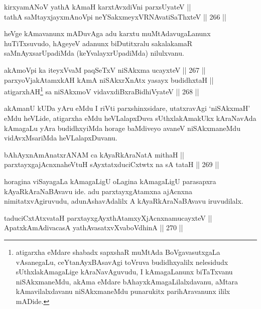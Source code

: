 \begin{shl}
kirxyamANoV yathA kAmaH karxtAvxdiVni parxsUyateV || \\
tathA saMtayxjayxmAnoV\s pi neYSakxmeyxVRNAvatiSaThxteV \hfill || 266 ||  
\end{shl}

\begin{artha}
heVge kAmavanunx mADuvAga adu karxtu muMtAdavugaLanunx huTiTxsuvudo,
hAgeyeV adanunx biDutitxralu sakalakamaR saMnAyxsarUpadiMda
(keYvalayxrUpadiMda) nilulxvanu.
\end{artha}


\begin{shl}
akAmoV\s pi ka iteyxVvaM paqSeTxV niSAkxma ucayxteV \hfill || 267 ||  \\
parxyoVjakAtamxkAH kAmA niSAkxrXnAtx yasayx budidhxtaH || \\
atigarxhAH\footnote{atigarxha eMdare shabadx sapxshaR muMtAda BoVgavasutxgaLa vAsanegaLu, ceYtanAyxBAsavAgi toVruva budidhxyalilx nelesidudx sUthxlakAmagaLige kAraNavAguvudu, I kAmagaLanunx biTaTxvanu niSAkxmaneMdu, akAma eMdare bAhayxkAmagaLilalxdavanu, aMtara kAmavilalxdavanu niSAkxmaneMdu punarukitx parihAravanunx ililx mADide.} sa niSAkxmoV vidavxdiBxraBidhiVyateV \hfill || 268 ||  
\end{shl}


\begin{artha}
akAmanU kUDa yAru eMdu I riVti parxshinxsidare, utatxravAgi
`niSAkxmaH' eMdu heVLide, atigarxha eMdu heVLalapxDuva sUthxlakAmakUkx
kAraNavAda kAmagaLu yAra budidhxyiMda horage baMdiveyo avaneV
niSAkxmaneMdu vidAvxMsariMda heVLalapxDuvanu.
\end{artha}

\begin{shl}
bAhAyxnAmAnatxrANAM ca kAyaRkAraNatA mithaH || \\
parxtayxgajAcnxnaheVtuH sAyxtatxduciCxtwtx na sA tataH \hfill || 269 ||  
\end{shl}

\begin{artha}
horagina viSayagaLa kAmagaLigU oLagina kAmagaLigU parasapxra
kAyaRkAraNaBAvavu ide. adu parxtayxgAtamxna ajAcnxna
nimitatxvAgiruvudu, adunAshavAdalilx A kAyaRkAraNaBAvavu iruvudilalx.
\end{artha}


\begin{shl}
taduciCxtAtxvataH parxtayxgAyxthAtamxyXjAcnxnamucayxteV || \\
ApatxkAmAdivacasA yathAvasatxvXvaboVdhinA \hfill || 270 ||  
\end{shl}


